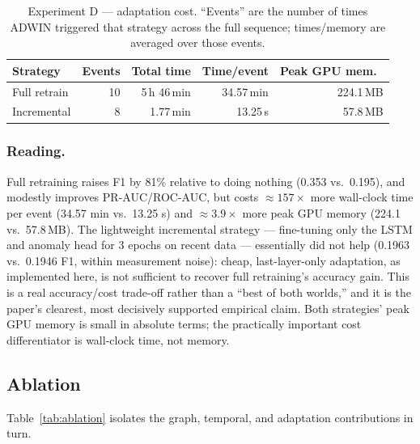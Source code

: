 \documentclass[twocolumn]{llncs}
\begin{document}
\begin{table}[t]
\centering
\caption{Experiment D --- adaptation cost. ``Events'' are the number of times ADWIN triggered that
strategy across the full sequence; times/memory are averaged over those events.}
\label{tab:expd-cost}
\footnotesize
\setlength{\tabcolsep}{3pt}
\begin{tabular}{|l|r|r|r|r|}
\hline
Strategy & Events & Total time & Time/event & Peak GPU mem.\ \\
\hline
Full retrain  & 10 & 5\,h 46\,min & 34.57\,min & 224.1\,MB \\
Incremental   & 8  & 1.77\,min   & 13.25\,s   & 57.8\,MB \\
\hline
\end{tabular}
\end{table}

\subsubsection{Reading.} Full retraining raises F1 by 81\% relative to doing nothing (0.353 vs.\
0.195), and modestly improves PR-AUC/ROC-AUC, but costs $\approx 157\times$ more wall-clock time
per event (34.57 min vs.\ 13.25 s) and $\approx 3.9\times$ more peak GPU memory (224.1 vs.\
57.8\,MB). The lightweight incremental strategy --- fine-tuning only the LSTM and anomaly head for
3 epochs on recent data --- essentially did not help (0.1963 vs.\ 0.1946 F1, within measurement
noise): cheap, last-layer-only adaptation, as implemented here, is not sufficient to recover full
retraining's accuracy gain. This is a real accuracy/cost trade-off rather than a ``best of both
worlds,'' and it is the paper's clearest, most decisively supported empirical claim. Both
strategies' peak GPU memory is small in absolute terms; the practically important cost
differentiator is wall-clock time, not memory.

\subsection{Ablation}
\label{sec:ablation}

Table~\ref{tab:ablation} isolates the graph, temporal, and adaptation contributions in turn.
\end{document}
